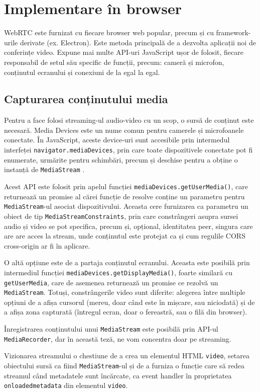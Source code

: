 \section{Implementare în browser}
\label{sec:ch3sec4}
\indent \par WebRTC este furnizat cu fiecare browser web popular, precum și cu framework-urile derivate (ex. Electron). Este metoda principală de a dezvolta aplicații noi de conferințe video. Expune mai multe API-uri JavaScript ușor de folosit, fiecare responsabil de setul său specific de funcții, precum: cameră și microfon, conținutul ecranului și conexiuni de la egal la egal.

\subsection{Capturarea conținutului media}
\label{sec:ch2sec4subsec1}
\indent \par Pentru a face folosi streaming-ul audio-video cu un scop, o sursă de conținut este necesară. Media Devices este un nume comun pentru camerele și microfoanele conectate. În JavaScript, aceste device-uri sunt accesibile prin intermedul interfeței \texttt{navigator.mediaDevices}, prin care toate dispozitivele conectate pot fi enumerate, urmărite pentru schimbări, precum și deschise pentru a obține o instanță de \texttt{MediaStream} \cite{WebMedia2014}.
\indent \par Acest API este folosit prin apelul funcției \texttt{mediaDevices.getUserMedia()}, care returnează un promise al cărei funcție de resolve conține un parametru pentru \texttt{MediaStream}-ul asociat dispozitivului. Aceasta cere furnizarea ca parametru un obiect de tip \texttt{MediaStreamConstraints}, prin care constrângeri asupra sursei audio și video se pot specifica, precum și, opțional, identitatea peer, singura care are are acces la stream, unde conținutul este protejat ca și cum regulile CORS cross-origin ar fi în aplicare.
\indent \par O altă opțiune este de a partaja conținutul ecranului. Aceasta este posibilă prin intermediul funcției \texttt{mediaDevices.getDisplayMedia()}, foarte similară cu \texttt{getUserMedia}, care de asemenea returnează un promise ce rezolvă un \texttt{MediaStream}. Totuși, constrângerile video sunt diferite: alegerea între multiple opțiuni de a afișa cursorul (mereu, doar când este în mișcare, sau niciodată) și de a afișa zona capturată (întregul ecran, doar o fereastră, sau o filă din browser).
\indent \par Înregistrarea conținutului unui \texttt{MediaStream} este posibilă prin API-ul \texttt{MediaRecorder}, dar în această teză, ne vom concentra doar pe streaming.
\indent \par Vizionarea streamului o chestiune de a crea un elementul HTML \texttt{video}, setarea obiectului sursă ca fiind \texttt{MediaStream}-ul și de a furniza o funcție care să redea streamul când metadatele sunt încărcate, ca event handler în proprietatea \texttt{onloadedmetadata} din elementul \texttt{video}.

